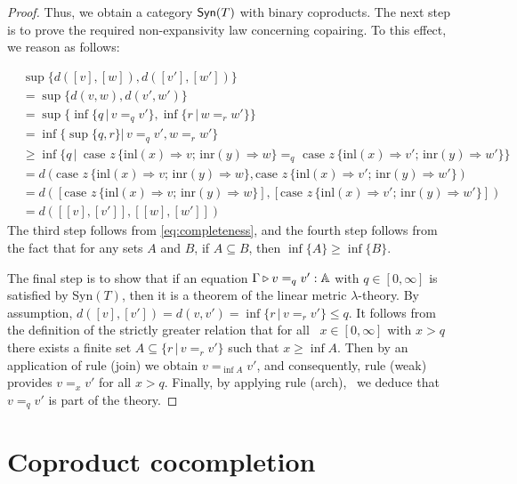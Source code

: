 \begin{proof}
  Thus, we obtain a category $\mathsf{Syn}(T)$ with binary coproducts.
 The next step is to prove the required non-expansivity law concerning copairing. To this effect, we reason as follows:

  \begin{align*}
    & \sup{\{d([v],[w]),d([v'],[w']) \}}  \\
    & = \sup{\{d(v,w),d(v',w') \}} \\
    & = \sup {\{ \inf{\{q \, \vert \, v=_q v'\}},\inf{\{r \, \vert \, w=_r w'\}}  \}} \\
    & = \inf{\{ \sup \{ q, r \} \vert \, v=_q v', w=_r w' \}} &  \\
    & \geq  \inf{ \{ q  \,\vert \, \text{ case } z \,   \{\text{inl} (x) \Rightarrow v ; \, \text{inr} (y) \Rightarrow w\} =_{q} \text{ case } z \,  \{\text{inl} (x) \Rightarrow v' ; \,\text{inr} (y) \Rightarrow w'\} \} } &  \\ 
    & = d(\text{case } z \,   \{\text{inl} (x) \Rightarrow v ; \, \text{inr} (y) \Rightarrow w\}, \text{case } z \,  \{\text{inl} (x) \Rightarrow v' ; \,\text{inr} (y) \Rightarrow w'\}) \\
    & = d([\text{case } z \,   \{\text{inl} (x) \Rightarrow v ; \, \text{inr} (y) \Rightarrow w\}], [\text{case } z \,  \{\text{inl} (x) \Rightarrow v' ; \,\text{inr} (y) \Rightarrow w'\}]) \\
    & = d([[v],[v']],[[w],[w']])  
  \end{align*}
   The third step follows from \autoref{eq:completeness}, and the fourth step follows from the fact that for any sets $A$ and $B$, if $A \subseteq B$, then $\inf\{A\} \geq \inf\{B\}$.

 The final step is to show that if an equation $\Gamma \triangleright v =_q v' : \mathbb{A}$ with $q \in [0, \infty]$ is satisfied by Syn$(T)$, then it is a theorem of the linear metric $\lambda$-theory. By assumption, $d([v],[v']) = d(v,v') =  \inf{ \{r \, \vert \, v =_r v'\}} \leq q$. It follows from the definition of the strictly greater relation that for all
 $x \in [0, \infty]$ with $x>q$ there exists a finite set $A \subseteq \{r \, \vert \, v =_r v'\}$ such that $x \geq \inf{A}$. Then by an
 application of rule (join) we obtain $v =_{\inf{A}} v'$, and consequently, rule (weak) provides $v =_x v'$ for all $x > q$. Finally, by applying rule (arch),  we deduce that $v =_q v'$ is part of the theory.
\end{proof}


\section{Coproduct cocompletion} \label{sec:Coproduct_cocompletion}


